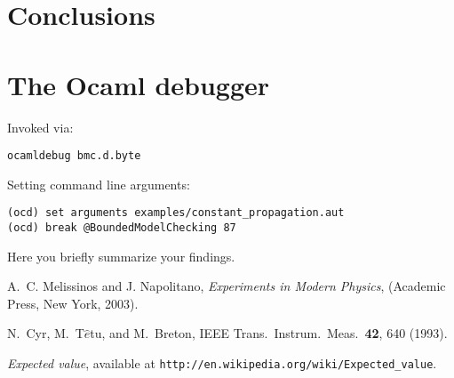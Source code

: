 \documentclass[letterpaper,12pt]{article}
\begin{document}
\section{Conclusions}
\section{The Ocaml debugger}
Invoked via:
\begin{verbatim}
ocamldebug bmc.d.byte
\end{verbatim}
Setting command line arguments:
\begin{verbatim}
(ocd) set arguments examples/constant_propagation.aut
(ocd) break @BoundedModelChecking 87
\end{verbatim}




Here you briefly summarize your findings.


\begin{thebibliography}{99}

A.~C. Melissinos and J. Napolitano, \textit{Experiments in Modern Physics},
(Academic Press, New York, 2003).

N.\ Cyr, M.\ T$\hat{e}$tu, and M.\ Breton,
IEEE Trans.\ Instrum.\ Meas.\ \textbf{42}, 640 (1993).

 \emph{Expected value},  available at
\texttt{http://en.wikipedia.org/wiki/Expected\_value}.

\end{thebibliography}
\end{document}
